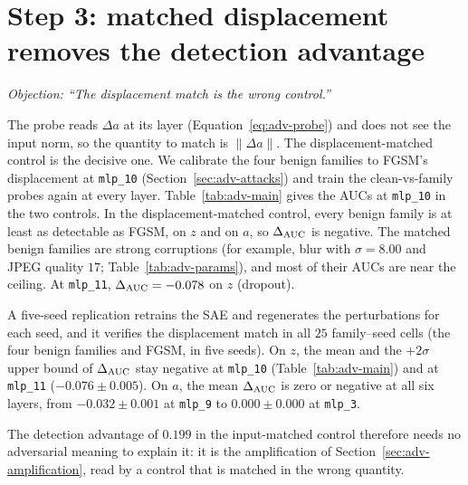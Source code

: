 \documentclass[../ppgc-tese.tex]{subfiles}
\begin{document}
\section{Step 3: matched displacement removes the detection advantage}
\label{sec:adv-main}
\emph{Objection: ``The displacement match is the wrong control.''}

The probe reads $\Delta a$ at its layer (Equation~\eqref{eq:adv-probe}) and
does not see the input norm, so the quantity to match is
$\lVert\Delta a\rVert$. The displacement-matched control is the decisive one.
We calibrate the four benign families to FGSM's displacement at
\texttt{mlp\_10} (Section~\ref{sec:adv-attacks}) and train the clean-vs-family
probes again at every layer. Table~\ref{tab:adv-main} gives the AUCs at
\texttt{mlp\_10} in the two controls. In the displacement-matched control,
every benign family is at least as detectable as FGSM, on $z$ and on $a$, so
$\Delta_{\mathrm{AUC}}$ is negative. The matched benign families are strong corruptions (for
example, blur with $\sigma=8.00$ and JPEG quality $17$;
Table~\ref{tab:adv-params}), and most of their AUCs are near the ceiling. At
\texttt{mlp\_11}, $\Delta_{\mathrm{AUC}}=-0.078$ on $z$ (dropout).

A five-seed replication retrains the SAE and regenerates the perturbations for
each seed, and it verifies the displacement match in all $25$ family--seed
cells (the four benign families and FGSM, in five seeds). On $z$, the mean and
the $+2\sigma$ upper bound of $\Delta_{\mathrm{AUC}}$ stay negative at \texttt{mlp\_10}
(Table~\ref{tab:adv-main}) and at \texttt{mlp\_11} ($-0.076\pm0.005$). On $a$,
the mean $\Delta_{\mathrm{AUC}}$ is zero or negative at all six layers, from $-0.032\pm0.001$
at \texttt{mlp\_9} to $0.000\pm0.000$ at \texttt{mlp\_3}.

The detection advantage of $0.199$ in the input-matched control therefore
needs no adversarial meaning to explain it: it is the amplification of
Section~\ref{sec:adv-amplification}, read by a control that is matched in the
wrong quantity.
\end{document}
